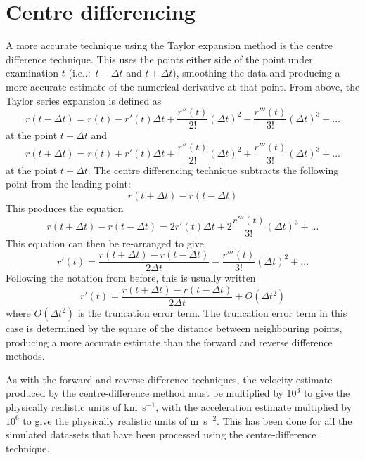 \section{Centre differencing}
\label{sect:centre}

A more accurate technique using the Taylor expansion method is the centre difference technique. This uses the points either side of the point under examination $t$ (i.e..:\ $t - \Delta t$ and $t + \Delta t$), smoothing the data and producing a more accurate estimate of the numerical derivative at that point. From above, the Taylor series expansion is defined as
\begin{equation}
r(t - \Delta t) = r(t) - r'(t)\Delta t +  \frac{r''(t)}{2!}(\Delta t)^{2} - \frac{r'''(t)}{3!}(\Delta t)^{3}  + ...
\end{equation}
at the point $t - \Delta t$ and 
\begin{equation}
r(t + \Delta t) = r(t) + r'(t)\Delta t +  \frac{r''(t)}{2!}(\Delta t)^{2} + \frac{r'''(t)}{3!}(\Delta t)^{3}  + ...
\end{equation}
at the point $t + \Delta t$. The centre differencing technique subtracts the following point from the leading point:
\begin{equation}
r(t + \Delta t) - r(t - \Delta t)
\end{equation}
This produces the equation
\begin{equation}
r(t + \Delta t) - r(t - \Delta t) = 2 r'(t)\Delta t +  2 \frac{r'''(t)}{3!}(\Delta t)^{3}  + ...
\end{equation}
This equation can then be re-arranged to give
\begin{equation}
r'(t) = \frac{r(t + \Delta t) - r(t - \Delta t)}{2 \Delta t} - \frac{r'''(t)}{3!}(\Delta t)^{2}  + ...
\end{equation}
Following the notation from before, this is usually written
\begin{equation}
r'(t) = \frac{r(t + \Delta t) - r(t - \Delta t)}{2 \Delta t} + O(\Delta t^{2})
\end{equation}
where $O(\Delta t^{2})$ is the truncation error term. The truncation error term in this case is determined by the square of the distance between neighbouring points, producing a more accurate estimate than the forward and reverse difference methods. 

As with the forward and reverse-difference techniques, the velocity estimate produced by the centre-difference method must be multiplied by $10^{3}$ to give the physically realistic units of km~s$^{-1}$, with the acceleration estimate multiplied by $10^{6}$ to give the physically realistic units of m~s$^{-2}$. This has been done for all the simulated data-sets that have been processed using the centre-difference technique.

